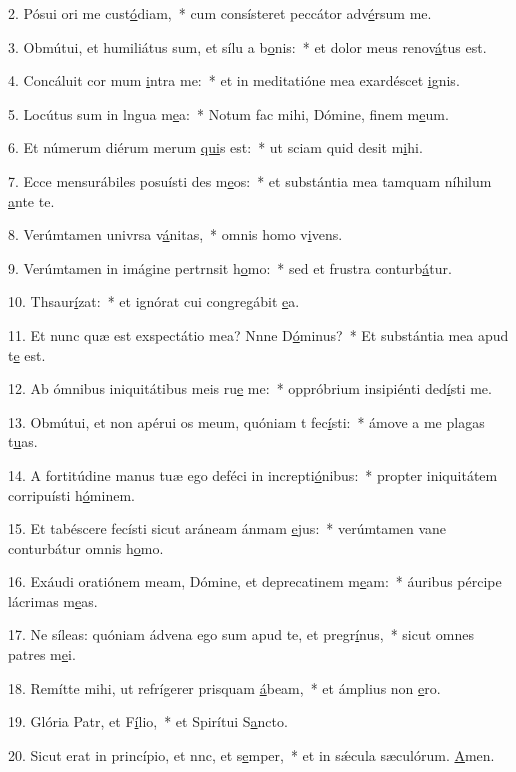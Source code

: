 2. Pósui ori me cust\uline{ó}diam,~* cum consísteret peccátor adv\uline{é}rsum me.\par 
3. Obmútui, et humiliátus sum, et sílu a b\uline{o}nis:~* et dolor meus renov\uline{á}tus est.\par 
4. Concáluit cor mum \uline{i}ntra me:~* et in meditatióne mea exardéscet \uline{i}gnis.\par 
5. Locútus sum in lngua m\uline{e}a:~* Notum fac mihi, Dómine, finem m\uline{e}um.\par 
6. Et númerum diérum merum \uline{qui}s est:~* ut sciam quid desit m\uline{i}hi.\par 
7. Ecce mensurábiles posuísti des m\uline{e}os:~* et substántia mea tamquam níhilum \uline{a}nte te.\par 
8. Verúmtamen univrsa v\uline{á}nitas,~* omnis homo v\uline{i}vens.\par 
9. Verúmtamen in imágine pertrnsit h\uline{o}mo:~* sed et frustra conturb\uline{á}tur.\par 
10. Thsaur\uline{í}zat:~* et ignórat cui congregábit \uline{e}a.\par 
11. Et nunc quæ est exspectátio mea? Nnne D\uline{ó}minus?~* Et substántia mea apud t\uline{e} est.\par 
12. Ab ómnibus iniquitátibus meis ru\uline{e} me:~* oppróbrium insipiénti ded\uline{í}sti me.\par 
13. Obmútui, et non apérui os meum, quóniam t fec\uline{í}sti:~* ámove a me plagas t\uline{u}as.\par 
14. A fortitúdine manus tuæ ego deféci in increpti\uline{ó}nibus:~* propter iniquitátem corripuísti h\uline{ó}minem.\par 
15. Et tabéscere fecísti sicut aráneam ánmam \uline{e}jus:~* verúmtamen vane conturbátur omnis h\uline{o}mo.\par 
16. Exáudi oratiónem meam, Dómine, et deprecatinem m\uline{e}am:~* áuribus pércipe lácrimas m\uline{e}as.\par 
17. Ne síleas: quóniam ádvena ego sum apud te, et pregr\uline{í}nus,~* sicut omnes patres m\uline{e}i.\par 
18. Remítte mihi, ut refrígerer prisquam \uline{á}beam,~* et ámplius non \uline{e}ro.\par 
19. Glória Patr, et F\uline{í}lio,~* et Spirítui S\uline{a}ncto.\par 
20. Sicut erat in princípio, et nnc, et s\uline{e}mper,~* et in sǽcula sæculórum. \uline{A}men.\par 
